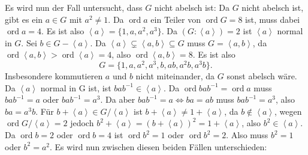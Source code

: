 \documentclass[a4paper,10pt]{article}
\theoremstyle{definition}
\newcommand{\ord}{\operatorname{ord}}
\newcommand{\gen}[1]{\left\langle#1\right\rangle}
\begin{document}
Es wird nun der Fall untersucht, dass $G$ nicht abelsch ist: Da $G$ nicht abelsch ist, gibt es ein $a \in G$ mit $a^2 \neq 1$. Da $\ord a$ ein Teiler von $\ord G = 8$ ist, muss dabei $\ord a = 4$. Es ist also $\gen{a} = \{1, a, a^2, a^3\}$. Da $(G : \gen{a}) = 2$ ist $\gen{a}$ normal in $G$. Sei $b \in G-\gen{a}$. Da $\gen{a} \subsetneq \gen{a,b} \subseteq G$ muss $G = \gen{a,b}$, da $\ord \gen{a,b} > \ord \gen{a} = 4$, also $\ord \gen{a,b} = 8$. Es ist also
\[
 G = \{1, a, a^2, a^3, b, ab, a^2 b, a^3 b\}.
\]
Insbesondere kommutieren $a$ und $b$ nicht miteinander, da $G$ sonst abelsch wäre. Da $\gen{a}$ normal in G ist, ist $bab^{-1} \in \gen{a}$. Da $\ord bab^{-1}  = \ord a$ muss $bab^{-1} = a$ oder $bab^{-1} = a^3$. Da aber $bab^{-1} = a \Leftrightarrow ba = ab$ muss $bab^{-1} = a^3$, also $ba = a^3 b$. Für $b+\gen{a} \in G/\!\gen{a}$ ist $b+\gen{a} \neq 1+\gen{a}$, da $b \not\in \gen{a}$, wegen $\ord G/\!\gen{a} = 2$ jedoch $b^2 + \gen{a} = (b+\gen{a})^2 = 1+\gen{a}$, also $b^2 \in \gen{a}$. Da $\ord b = 2$ oder $\ord b = 4$ ist $\ord b^2 = 1$ oder $\ord b^2 = 2$. Also muss $b^2 = 1$ oder $b^2 = a^2$. Es wird nun zwischen diesen beiden Fällen unterschieden:
\end{document}
